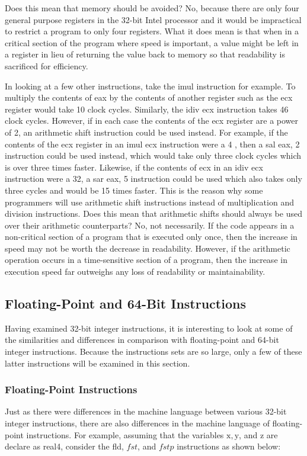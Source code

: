 \documentclass[10pt]{article}
\begin{document}
Does this mean that memory should be avoided? No, because there are only four general purpose registers in the 32-bit Intel processor and it would be impractical to restrict a program to only four registers. What it does mean is that when in a critical section of the program where speed is important, a value might be left in a register in lieu of returning the value back to memory so that readability is sacrificed for efficiency.

In looking at a few other instructions, take the imul instruction for example. To multiply the contents of eax by the contents of another register such as the ecx register would take 10 clock cycles. Similarly, the idiv ecx instruction takes 46 clock cycles. However, if in each case the contents of the ecx register are a power of 2, an arithmetic shift instruction could be used instead. For example, if the contents of the ecx register in an imul ecx instruction were a 4 , then a sal eax, 2 instruction could be used instead, which would take only three clock cycles which is over three times faster. Likewise, if the contents of ecx in an idiv ecx instruction were a 32, a sar eax, 5 instruction could be used which also takes only three cycles and would be 15 times faster. This is the reason why some programmers will use arithmetic shift instructions instead of multiplication and division instructions. Does this mean that arithmetic shifts should always be used over their arithmetic counterparts? No, not necessarily. If the code appears in a non-critical section of a program that is executed only once, then the increase in speed may not be worth the decrease in readability. However, if the arithmetic operation occurs in a time-sensitive section of a program, then the increase in execution speed far outweighs any loss of readability or maintainability.

\subsection*{Floating-Point and 64-Bit Instructions}
Having examined 32-bit integer instructions, it is interesting to look at some of the similarities and differences in comparison with floating-point and 64-bit integer instructions. Because the instructions sets are so large, only a few of these latter instructions will be examined in this section.

\subsubsection*{Floating-Point Instructions}
Just as there were differences in the machine language between various 32-bit integer instructions, there are also differences in the machine language of floating-point instructions. For example, assuming that the variables $\mathrm{x}, \mathrm{y}$, and z are declare as real4, consider the fld, $f s t$, and $f s t p$ instructions as shown below:
\end{document}
